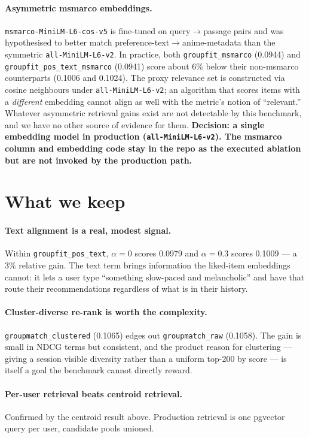 \documentclass[11pt]{article}
\begin{document}
\paragraph{Asymmetric msmarco embeddings.}
\texttt{msmarco-MiniLM-L6-cos-v5} is fine-tuned on
query$\to$passage pairs and was hypothesised to better match
preference-text$\to$anime-metadata than the symmetric
\texttt{all-MiniLM-L6-v2}. In practice, both \texttt{groupfit\_msmarco}
(0.0944) and \texttt{groupfit\_pos\_text\_msmarco} (0.0941) score about
6\% below their non-msmarco counterparts (0.1006 and 0.1024). The
proxy relevance set is constructed via cosine neighbours under
\texttt{all-MiniLM-L6-v2}; an algorithm that scores items with a
\emph{different} embedding cannot align as well with the metric's
notion of ``relevant.'' Whatever asymmetric retrieval gains exist are
not detectable by this benchmark, and we have no other source of
evidence for them.
\textbf{Decision: a single embedding model in production
(\texttt{all-MiniLM-L6-v2}). The msmarco column and embedding code stay
in the repo as the executed ablation but are not invoked by the
production path.}

\section{What we keep}

\paragraph{Text alignment is a real, modest signal.}
Within \texttt{groupfit\_pos\_text}, $\alpha = 0$ scores 0.0979 and
$\alpha = 0.3$ scores 0.1009 --- a 3\% relative gain. The text term
brings information the liked-item embeddings cannot: it lets a user
type ``something slow-paced and melancholic'' and have that route their
recommendations regardless of what is in their history.

\paragraph{Cluster-diverse re-rank is worth the complexity.}
\texttt{groupmatch\_clustered} (0.1065) edges out
\texttt{groupmatch\_raw} (0.1058). The gain is small in NDCG terms but
consistent, and the product reason for clustering --- giving a session
visible diversity rather than a uniform top-200 by score --- is itself
a goal the benchmark cannot directly reward.

\paragraph{Per-user retrieval beats centroid retrieval.}
Confirmed by the centroid result above. Production retrieval is one
pgvector query per user, candidate pools unioned.
\end{document}
